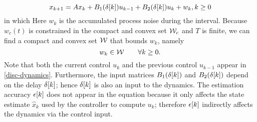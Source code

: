 \begin{equation}
x_{k+1}=Ax_{k}+B_{1}(\sDelay[k])u_{k-1}+B_{2}(\sDelay[k])u_{k}+w_{k}, k\geq0\label{eq:disc-dynamics} %
\end{equation}
in which
Here $w_{k}$ is the accumulated process noise during the interval.
Because $w_{c}(t)$ is constrained in the compact and convex set $\mathcal{W}_{c}$
and $T$ is finite, we can find a compact and convex set $\mathcal{W}$
that bounds $w_{k}$, namely
\begin{equation}
w_{k}\in\mathcal{W}\qquad\forall k\geq0\text{.}\label{eq:disturb-constraint}
\end{equation}
Note that both the current control $u_{k}$ and the previous
control $u_{k-1}$ appear %
in \eqref{disc-dynamics}.
Furthermore, the input matrices $B_{1}(\delta[k])$ and $B_{2}(\delta[k])$
depend on the delay $\delta[k]$; hence $\delta[k]$ is also an
input to the dynamics. The estimation accuracy $\epsilon[k]$ does not
appear in the equation because it only affects the state estimate
$\hat{x}_{k}$ %
used by the controller to compute $u_{k}$;
therefore $\epsilon[k]$ indirectly affects the dynamics via the control
input.







